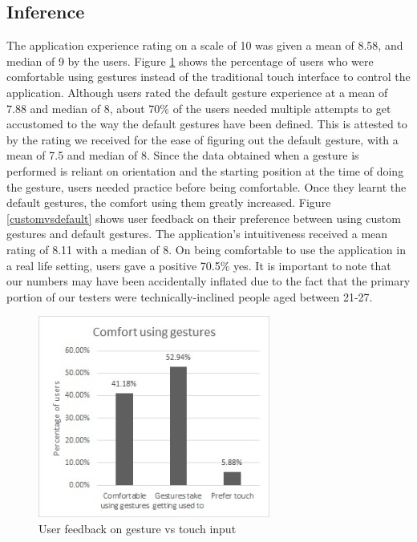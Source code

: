 \documentclass[journal]{IEEEtran}
\begin{document}
\subsection{Inference}

The application experience rating on a scale of 10 was given a mean of 8.58,  and median of 9 by the users. Figure \ref{gesturevstouch} shows the percentage of users who were comfortable using gestures instead of the traditional touch interface to control the application.  Although users rated the default gesture experience at a mean of 7.88 and median of 8, about 70\% of the users needed multiple attempts to get accustomed to the way the default gestures have been defined. This is attested to by the rating we received for the ease of figuring out the default gesture, with a mean of 7.5 and median of 8. Since the data obtained when a gesture is performed is reliant on orientation and the starting position at the time of doing the gesture, users needed practice before being comfortable. Once they learnt the default gestures, the comfort using them greatly increased. Figure \ref{customvsdefault} shows user feedback on their preference between using custom gestures and default gestures. The application's intuitiveness received a mean rating of 8.11 with a median of 8. On being comfortable to use the application in a real life setting, users gave a positive 70.5\% yes. It is important to note that our numbers may have been accidentally inflated due to the fact that the primary portion of our testers were technically-inclined people aged between 21-27.
	

\begin{figure}[!t]
\centering
\includegraphics[width=3in]{R5.jpg}
\caption{User feedback on gesture vs touch input}
\label{gesturevstouch}
\end{figure}
\end{document}
